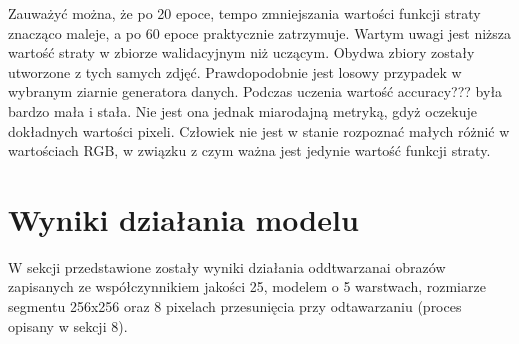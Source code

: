 \documentclass[a4paper,11pt]{article}
\begin{document}
Zauważyć można, że po 20 epoce, tempo zmniejszania wartości funkcji straty znacząco maleje,
a po 60 epoce praktycznie zatrzymuje.
Wartym uwagi jest niższa wartość straty w zbiorze walidacyjnym niż uczącym. Obydwa zbiory zostały utworzone z tych samych zdjęć.
Prawdopodobnie jest losowy przypadek w wybranym ziarnie generatora danych.
Podczas uczenia wartość accuracy??? była bardzo mała i stała. Nie jest ona jednak miarodajną metryką, gdyż oczekuje dokładnych wartości pixeli.
Człowiek nie jest w stanie rozpoznać małych różnić w wartościach RGB, w związku z czym ważna jest jedynie wartość funkcji straty.

\section{Wyniki działania modelu}
W sekcji przedstawione zostały wyniki działania oddtwarzanai obrazów zapisanych ze współczynnikiem jakości 25,
modelem o 5 warstwach, rozmiarze segmentu 256x256 oraz 8 pixelach przesunięcia przy odtawarzaniu (proces opisany w sekcji 8).
\newpage
\end{document}
